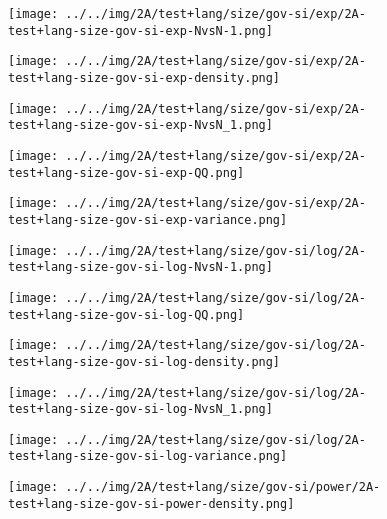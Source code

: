 \begin{figure}[H]
\centering	\texttt{[image: ../../img/2A/test+lang/size/gov-si/exp/2A-test+lang-size-gov-si-exp-NvsN-1.png]}
\end{figure}
\begin{figure}[H]
\centering	\texttt{[image: ../../img/2A/test+lang/size/gov-si/exp/2A-test+lang-size-gov-si-exp-density.png]}
\end{figure}
\begin{figure}[H]
\centering	\texttt{[image: ../../img/2A/test+lang/size/gov-si/exp/2A-test+lang-size-gov-si-exp-NvsN\_1.png]}
\end{figure}
\begin{figure}[H]
\centering	\texttt{[image: ../../img/2A/test+lang/size/gov-si/exp/2A-test+lang-size-gov-si-exp-QQ.png]}
\end{figure}
\begin{figure}[H]
\centering	\texttt{[image: ../../img/2A/test+lang/size/gov-si/exp/2A-test+lang-size-gov-si-exp-variance.png]}
\end{figure}
\begin{figure}[H]
\centering	\texttt{[image: ../../img/2A/test+lang/size/gov-si/log/2A-test+lang-size-gov-si-log-NvsN-1.png]}
\end{figure}
\begin{figure}[H]
\centering	\texttt{[image: ../../img/2A/test+lang/size/gov-si/log/2A-test+lang-size-gov-si-log-QQ.png]}
\end{figure}
\begin{figure}[H]
\centering	\texttt{[image: ../../img/2A/test+lang/size/gov-si/log/2A-test+lang-size-gov-si-log-density.png]}
\end{figure}
\begin{figure}[H]
\centering	\texttt{[image: ../../img/2A/test+lang/size/gov-si/log/2A-test+lang-size-gov-si-log-NvsN\_1.png]}
\end{figure}
\begin{figure}[H]
\centering	\texttt{[image: ../../img/2A/test+lang/size/gov-si/log/2A-test+lang-size-gov-si-log-variance.png]}
\end{figure}
\begin{figure}[H]
\centering	\texttt{[image: ../../img/2A/test+lang/size/gov-si/power/2A-test+lang-size-gov-si-power-density.png]}
\end{figure}
